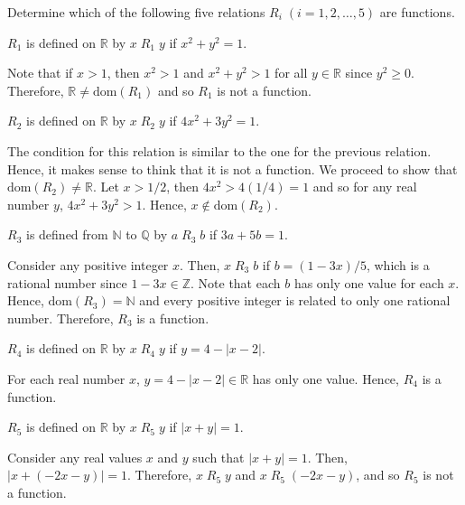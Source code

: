 \documentclass[12pt]{article}
\newcommand{\N}{\mathbb{N}}
\newcommand{\Z}{\mathbb{Z}}
\newcommand{\R}{\mathbb{R}}
\newcommand{\Q}{\mathbb{Q}}
\newcommand{\dom}[1]{\mathrm{dom}\left(#1\right)}
\newcommand{\rel}[3]{#2\; #1\; #3}
\newenvironment{problem}[2][Problem]{\begin{trivlist} \item[\hskip \labelsep {\bfseries #1}\hskip \labelsep {\bfseries #2.}]}{\end{trivlist}}
\newenvironment{solution}[2][Solution]{\begin{trivlist} \item[\hskip \labelsep {\bfseries #1}\hskip \labelsep {\bfseries #2.}]}{\end{trivlist}}
\begin{document}
    \begin{problem}{9}
	Determine which of the following five relations $R_{i}\; (i=1,2,\dots,5)$ are functions.
     \begin{enumerate}[label=(\alph*)]
       \item $R_{1}$ is defined on $\R$ by $x\; R_{1}\;y$ if $x^{2}+y^{2}=1$. 
	 \begin{solution}{(a)}
	   Note that if $x>1$, then $x^{2}> 1$ and $x^{2}+y^{2}> 1$ for all $y\in\R$ since $y^{2}\geq 0$. Therefore, $\R \neq \text{dom}(R_{1})$ and so $R_{1}$ is not a function.
         \end{solution}
       \item $R_{2}$ is defined on $\R$ by $x\; R_{2}\;y$ if $4x^{2}+3y^{2}=1$.
	 \begin{solution}{(b)}
	   The condition for this relation is similar to the one for the previous relation. Hence, it makes sense to think that it is not a function. We proceed to show that $\dom{R_2}\neq \R$. Let  $x>1/2$, then $4x^{2} > 4(1/4) =1$ and so for any real number $y$, $4x^{2} + 3y^{2} > 1$. Hence, $x\not\in \dom{R_{2}}$. 
         \end{solution}
       \item $R_{3}$ is defined from $\N$ to $\Q$ by $a\; R_{3}\;b$ if $3a+5b=1$.
	 \begin{solution}{(c)}
             Consider any positive integer $x$. Then, $\rel{R_{3}}{x}{b}$ if $b=(1-3x)/5$, which is a rational number since $1-3x\in\Z$. Note that each $b$ has only one value for each $x$. Hence, $\dom{R_{3}}=\N$ and every positive integer is related to only one rational number. Therefore, $R_{3}$ is a function.
         \end{solution}
       \item $R_{4}$ is defined on $\R$ by $x\; R_{4}\;y$ if $y=4-|x-2|$.
	 \begin{solution}{(d)}
	   For each real number $x$, $y=4-|x-2|\in \R$ has only one value. Hence, $R_{4}$ is a function.  
         \end{solution}
       \item $R_{5}$ is defined on $\R$ by $x\; R_{5}\;y$ if $|x+y|=1$.
	 \begin{solution}{(e)}
	   Consider any real values $x$ and $y$ such that $|x+y|=1$. Then, $|x+(-2x-y)| =1$. Therefore, $\rel{R_{5}}{x}{y}$ and $\rel{R_{5}}{x}{(-2x-y)}$, and so $R_{5}$ is not a function.
         \end{solution}
     \end{enumerate}
    \end{problem}



 
\end{document}
